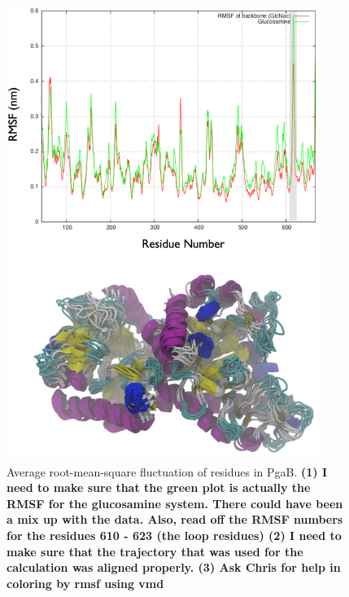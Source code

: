 \begin{figure}[htbp]
\centering
\includegraphics[width=4in]{figures/results4/rmsf.pdf}
\caption[RMSF of residues in PgaB]{Average root-mean-square fluctuation of residues in PgaB. \textbf{(1) I need to make sure that the green plot is actually the RMSF for the glucosamine system. There could have been a mix up with the data. Also, read off the RMSF numbers for the residues 610 - 623 (the loop residues) (2) I need to make sure that the trajectory that was used for the calculation was aligned properly. (3) Ask Chris for help in coloring by rmsf using vmd}}
\label{fig:rmsf}
\end{figure}


